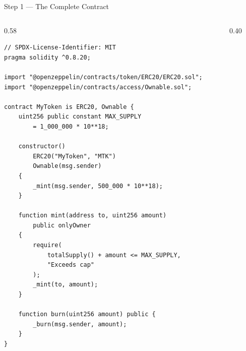 \documentclass[8pt,aspectratio=169]{beamer}
\begin{document}
\begin{frame}[fragile]{Step 1 --- The Complete Contract}
\vspace{-2mm}
\begin{columns}[T]
\begin{column}{0.58\linewidth}
\begin{lstlisting}[basicstyle=\ttfamily\tiny,xleftmargin=0pt,xrightmargin=0pt,linewidth=\linewidth]
// SPDX-License-Identifier: MIT
pragma solidity ^0.8.20;

import "@openzeppelin/contracts/token/ERC20/ERC20.sol";
import "@openzeppelin/contracts/access/Ownable.sol";

contract MyToken is ERC20, Ownable {
    uint256 public constant MAX_SUPPLY
        = 1_000_000 * 10**18;

    constructor()
        ERC20("MyToken", "MTK")
        Ownable(msg.sender)
    {
        _mint(msg.sender, 500_000 * 10**18);
    }

    function mint(address to, uint256 amount)
        public onlyOwner
    {
        require(
            totalSupply() + amount <= MAX_SUPPLY,
            "Exceeds cap"
        );
        _mint(to, amount);
    }

    function burn(uint256 amount) public {
        _burn(msg.sender, amount);
    }
}
\end{lstlisting}
\end{column}
\begin{column}{0.40\linewidth}
\end{column}
\end{columns}
\end{frame}
\end{document}
